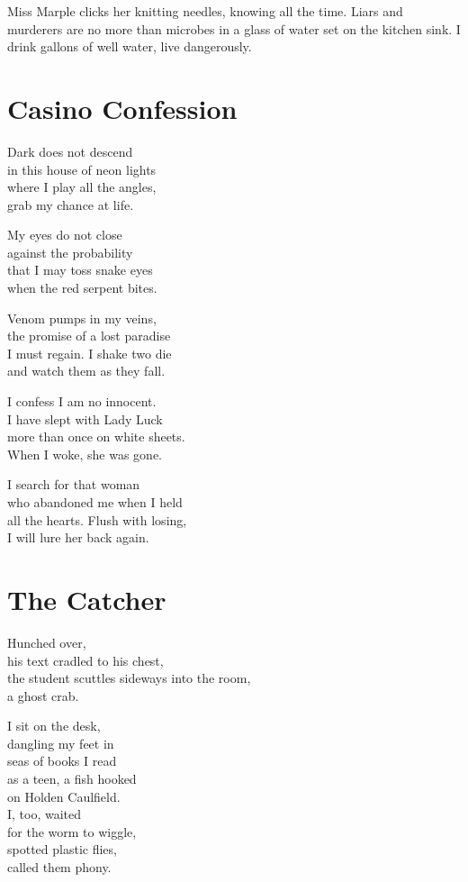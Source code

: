 \documentclass[twoside,10pt]{book}
\begin{document}
Miss Marple clicks her knitting needles, knowing all the time. Liars and
murderers are no more than microbes in a glass of water set on the
kitchen sink. I drink gallons of well water, live dangerously.


\clearpage
\section{Casino Confession}

Dark does not descend\\
in this house of neon lights\\
where I play all the angles,\\
grab my chance at life.

My eyes do not close\\
against the probability\\
that I may toss snake eyes\\
when the red serpent bites.

Venom pumps in my veins,\\
the promise of a lost paradise\\
I must regain. I shake two die\\
and watch them as they fall.

I confess I am no innocent.\\
I have slept with Lady Luck\\
more than once on white sheets.\\
When I woke, she was gone.

I search for that woman\\
who abandoned me when I held\\
all the hearts. Flush with losing,\\
I will lure her back again.


\clearpage
\section{The Catcher}

Hunched over,\\
his text cradled to his chest,\\
the student scuttles sideways into the room,\\
a ghost crab.

I sit on the desk,\\
dangling my feet in\\
seas of books I read\\
as a teen, a fish hooked\\
on Holden Caulfield.\\
I, too, waited\\
for the worm to wiggle,\\
spotted plastic flies,\\
called them phony.
\end{document}
